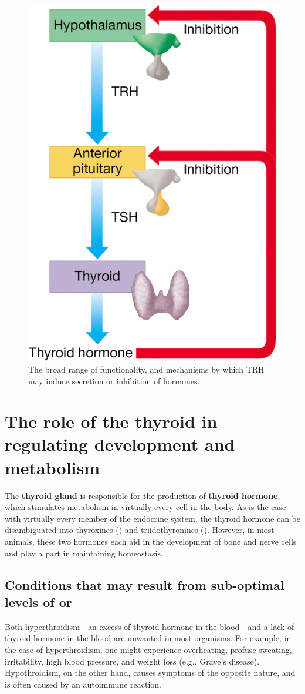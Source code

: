 \documentclass{article}
\begin{document}
\begin{figure}[h]
	\centering
	\includegraphics[width=0.4\linewidth]{hormone_chain_of_command.png}
	\caption{The broad range of functionality, and mechanisms by which TRH may induce secretion or inhibition of hormones.}
\end{figure}

\section{The role of the thyroid in regulating development and metabolism}

The \textbf{thyroid gland} is responsible for the production of
\textbf{thyroid hormone}, which stimulates metabolism in virtually every cell
in the body.
As is the case with virtually every member of the endocrine system, the thyroid
hormone can be disambiguated into thyroxines () and triidothyronines
(). However, in most animals, these two hormones each aid in the development
of bone and nerve cells and play a part in maintaining homeostasis.

\subsection{Conditions that may result from sub-optimal levels of  or }

Both hyperthroidism---an excess of thyroid hormone in the blood---and a lack
of thyroid hormone in the blood are unwanted in most organisms. For example,
in the case of hyperthroidism, one might experience overheating, profuse
sweating, irritability, high blood pressure, and weight loss (e.g., Grave's
disease). Hypothroidism, on the other hand, causes symptoms of the opposite
nature, and is often caused by an autoimmune reaction.
\end{document}
